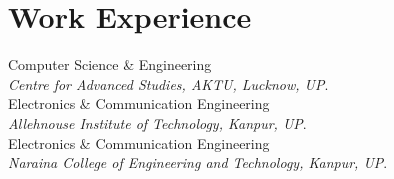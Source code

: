 \vspace{-2.5em}\section{Work Experience}
 Computer Science \& Engineering  \\
{\sl Centre for Advanced Studies, AKTU, Lucknow, UP}.\\
 Electronics \& Communication Engineering \\
{\sl Allehnouse Institute of Technology, Kanpur, UP}.\\
 Electronics \& Communication Engineering  \\
{\sl Naraina College of Engineering and Technology, Kanpur, UP}.\\
\vspace{-1em}
\sectionline

